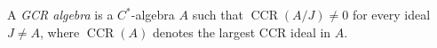 A \emph{GCR algebra} is a $C^*$-algebra $A$ such that $\operatorname{CCR}(A/J) \neq 0$ for every ideal $J \neq A$, where $\operatorname{CCR}(A)$ denotes the largest CCR ideal in $A$.
